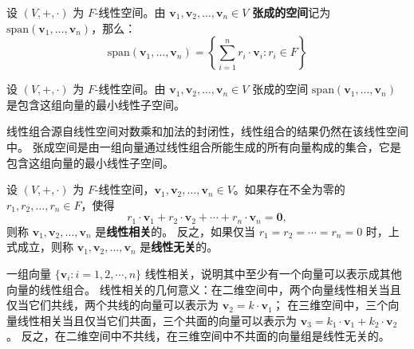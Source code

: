 \begin{definition}
    设 $ (V,+,\cdot) $ 为 $ F $-线性空间。由 $ \mathbf{v}_1,\mathbf{v}_2,\ldots,\mathbf{v}_n\in V $ \textbf{张成的空间}记为 $\mathrm{span}(\mathbf{v}_1,\ldots,\mathbf{v}_n)$，那么：
    \[
        \mathrm{span}(\mathbf{v}_1,\ldots,\mathbf{v}_n) = \left\{ \sum_{i=1}^{n} r_i\cdot \mathbf{v}_i : r_i\in F \right\}
    \]
    \label{def:span}
\end{definition}
\begin{proposition}
    设 $ (V,+,\cdot) $ 为 $ F $-线性空间。由 $ \mathbf{v}_1,\mathbf{v}_2,\ldots,\mathbf{v}_n\in V $ 张成的空间 $\mathrm{span}(\mathbf{v}_1,\ldots,\mathbf{v}_n)$ 是包含这组向量的最小线性子空间。
\end{proposition}
\begin{note}
    线性组合源自线性空间对数乘和加法的封闭性，线性组合的结果仍然在该线性空间中。
    张成空间是由一组向量通过线性组合所能生成的所有向量构成的集合，它是包含这组向量的最小线性子空间。
\end{note}
\vspace{1em}

\begin{definition} 
    设 $ (V,+,\cdot) $ 为 $ F $-线性空间，$ \mathbf{v}_1,\mathbf{v}_2,\ldots,\mathbf{v}_n\in V $。如果存在不全为零的 $ r_1,r_2,\ldots,r_n\in F $，使得
    \[
        r_1\cdot \mathbf{v}_1 + r_2\cdot \mathbf{v}_2 + \cdots + r_n\cdot \mathbf{v}_n = \mathbf{0},
    \]
    则称 $ \mathbf{v}_1,\mathbf{v}_2,\ldots,\mathbf{v}_n $ 是\textbf{线性相关}的。
    反之，如果仅当 $ r_1=r_2=\cdots=r_n=0 $ 时，上式成立，则称 $ \mathbf{v}_1,\mathbf{v}_2,\ldots,\mathbf{v}_n $ 是\textbf{线性无关}的。
    \label{def:linear_dependence}
\end{definition}

\begin{note}
    一组向量 $\{\mathbf{v}_i:i=1,2,\cdots,n\}$ 线性相关，说明其中至少有一个向量可以表示成其他向量的线性组合。
    线性相关的几何意义：在二维空间中，两个向量线性相关当且仅当它们共线，两个共线的向量可以表示为 $\mathbf{v}_2=k\cdot \mathbf{v}_1$；
    在三维空间中，三个向量线性相关当且仅当它们共面，三个共面的向量可以表示为 $\mathbf{v}_3=k_1\cdot \mathbf{v}_1 + k_2\cdot \mathbf{v}_2$。
    反之，在二维空间中不共线，在三维空间中不共面的向量组是线性无关的。
\end{note}

\vspace{1em}

